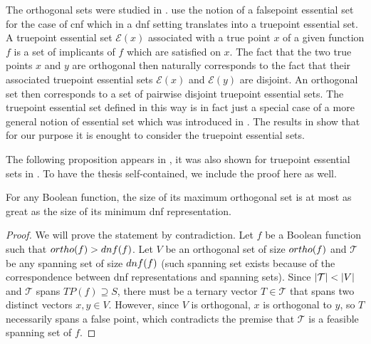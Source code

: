 The orthogonal sets were studied in \citet{Cepek2012}.
\citeauthor{Cepek2012}
use the notion of a falsepoint essential set
for the case of \acrlong{cnf}
which in a \acrshort{dnf} setting
translates into a truepoint essential set.
A truepoint essential set $\mathcal{E}(x)$
associated with a true point $x$
of a given function $f$
is a set of implicants
of $f$ which are satisfied on $x$.
The fact that the two true points $x$ and $y$
are orthogonal then naturally corresponds to
the fact that their associated truepoint essential sets
$\mathcal{E}(x)$ and $\mathcal{E}(y)$ are disjoint.
An orthogonal set then corresponds
to a set of pairwise disjoint truepoint essential sets.
The truepoint essential set defined in this way
is in fact just a special case of a more general notion
of essential set which was introduced in \citet{Boros2010}.
The results in \citet{Cepek2012}
show that for our purpose it is enought
to consider the truepoint essential sets.

The following proposition appears in \citep{Dubovsky2012},
it was also shown for truepoint
essential sets in \citep{Cepek2012}.
To have the thesis self-contained,
we include the proof here as well.

\begin{theorem}
[$\apply{ortho}{f} \leq \apply{dnf}{f}$
{\theoremsource[Observation 1.1]{Dubovsky2012}} %
{\theoremsource[Theorem 2.8, Corollary 3.2]{Cepek2012}}] %
\label{theorem:orthodnf}
For any Boolean function,
the size of its maximum orthogonal set
is at most as great
as the size of its minimum \acrshort{dnf} representation.
\end{theorem}

\begin{proof}
We will prove the statement by contradiction.
Let $f$ be a Boolean function such that
$ortho (f) > dnf (f)$.
Let $V$ be an orthogonal set of size $ortho (f)$
and $\mathcal{T}$ be any spanning set
of size $dnf (f)$
(such spanning set exists because of the correspondence
between \acrshort{dnf} representations and spanning sets).
Since $\lvert\mathcal{T}\rvert < \lvert V\rvert$
and $\mathcal{T}$ spans $TP(f) \supseteq S$,
there must be a ternary vector $T \in \mathcal{T}$
that spans
two distinct vectors $x, y \in V$.
However,
since $V$ is orthogonal,
$x$ is orthogonal to $y$,
so $T$ necessarily spans a false point,
which contradicts the premise that $\mathcal{T}$
is a feasible spanning set of $f$.
\end{proof}

